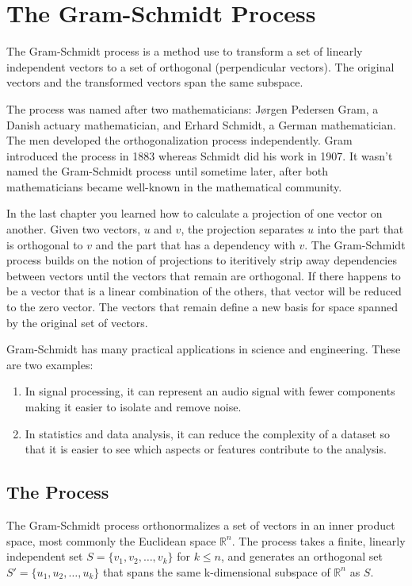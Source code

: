 \chapter{The Gram-Schmidt Process}

The Gram-Schmidt process is a method use to transform a set of linearly independent vectors to a set of orthogonal (perpendicular vectors). The original vectors and the transformed vectors span the same subspace. 

The process was named after two mathematicians: Jørgen Pedersen Gram, a Danish actuary mathematician, and Erhard Schmidt, a German mathematician. The men developed the orthogonalization process independently. Gram introduced the process in 1883 whereas Schmidt did his work in 1907.  It wasn’t named the Gram-Schmidt process until sometime later, after both mathematicians became well-known in the mathematical community.

In the last chapter you learned how to calculate a projection of one vector on another. Given two vectors, $u$ and $v$, the projection separates $u$ into the part that is orthogonal to $v$ and the part that has a dependency with $v$. The Gram-Schmidt process builds on the notion of projections to iteritively strip away dependencies between vectors until the vectors that remain are orthogonal. If there happens to be a vector that is a linear combination of the others, that vector will be reduced to the zero vector. The vectors that remain define a new basis for space spanned by the original set of vectors. 

Gram-Schmidt has many practical applications in science and engineering. These are two examples:
\begin{enumerate}
\item In signal processing, it can represent an audio signal with fewer components making it easier to isolate and remove noise. 
\item In statistics and data analysis, it can reduce the complexity of a dataset so that it is easier to see which aspects or features contribute to the analysis. 
\end{enumerate}

\section{The Process}

The Gram-Schmidt process orthonormalizes a set of vectors in an inner product space, most commonly the Euclidean space
$\mathbb{R}^n$. The process takes a finite, linearly independent set
$S = \{v_1, v_2, \ldots, v_k\}$ for $k \leq n$, and generates an
orthogonal set $S' = \{u_1, u_2, \ldots, u_k\}$ that spans the same
k-dimensional subspace of $\mathbb{R}^n$ as $S$.

